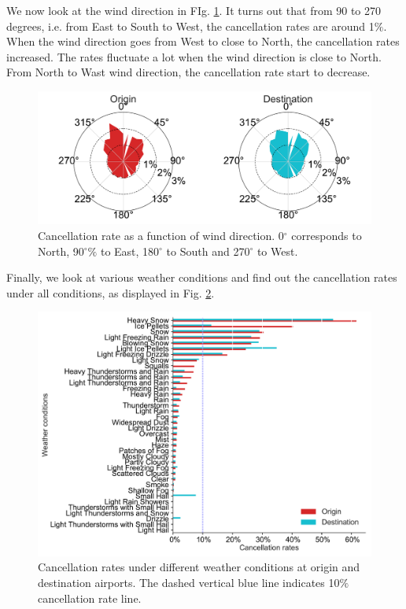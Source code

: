 \documentclass[12pt]{article}
\begin{document}
We now look at the wind direction in FIg. \ref{fig:winddircanrate}. It turns out that from 90 to 270 degrees, i.e. from East to South to West, the cancellation rates are around 1$\%$. When the wind direction goes from West to close to North, the cancellation rates increased. The rates fluctuate a lot when the wind direction is close to North. From North to Wast wind direction, the cancellation rate start to decrease.
\begin{figure}[h!]
\begin{center}
\includegraphics[width=6in]{winddir_canrate.pdf}
\end{center}
\caption{\label{fig:winddircanrate}
Cancellation rate as a function of wind direction. 0$^\circ$ corresponds to North, 90$^\circ$$\%$ to East, 180$^\circ$ to South and 270$^\circ$ to West.}
\end{figure}
Finally, we look at various weather conditions and find out the cancellation rates under all conditions, as displayed in Fig. \ref{fig:conditionscanrate}.
\begin{figure}[h!]
\begin{center}
\includegraphics[width=6in]{conditions_canrate.pdf}
\end{center}
\caption{\label{fig:conditionscanrate}
Cancellation rates under different weather conditions at origin and destination airports. The dashed vertical blue line indicates 10$\%$ cancellation rate line.}
\end{figure}
\end{document}
